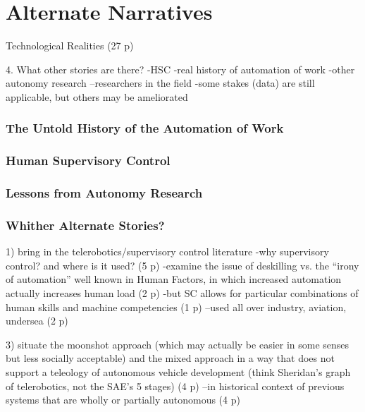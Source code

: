 \chapter{Alternate Narratives}

Technological Realities (27 p)

4. What other stories are there?
-HSC
-real history of automation of work
-other autonomy research
--researchers in the field
-some stakes (data) are still applicable, but others may be
ameliorated


\subsection{The Untold History of the Automation of Work}

\subsection{Human Supervisory Control}

\subsection{Lessons from Autonomy Research}

\subsection{Whither Alternate Stories?}



1) bring in the telerobotics/supervisory control literature
-why supervisory control? and where is it used? (5 p)
-examine the issue of deskilling vs. the ``irony of automation'' well
known in Human Factors, in which increased automation actually
increases human load (2 p)
-but SC allows for particular combinations of human skills and machine
competencies (1 p)
--used all over industry, aviation, undersea (2 p)


3) situate the moonshot approach (which may actually be easier in some
senses but less socially acceptable) and the mixed approach in a way
that does not support a teleology of autonomous vehicle development
(think Sheridan's graph of telerobotics, not the SAE's 5 stages) (4 p)
--in historical context of previous systems that are wholly or
partially autonomous (4 p)





